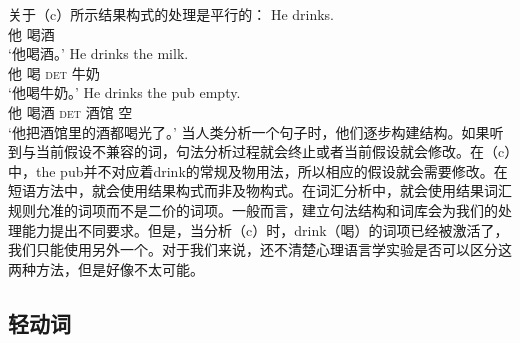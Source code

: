 \begin{exe}
\begin{xlist}[iv.]
\begin{exe}
\begin{xlist}[iv.]
关于（c）所示结果构式的处理是平行的：
\eal
\ex
\gll He drinks.\\
     他 喝酒\\
\glt `他喝酒。' 
\ex
\gll He drinks the milk.\\
     他 喝 \textsc{det} 牛奶\\
\glt `他喝牛奶。' 
\ex
\gll He drinks the pub empty.\\
     他 喝酒 \textsc{det} 酒馆 空\\
\glt `他把酒馆里的酒都喝光了。' 
\zl
当人类分析一个句子时，他们逐步构建结构。如果听到与当前假设不兼容的词，句法分析过程就会终止或者当前假设就会修改。在（c）中，the pub并不对应着drink的常规及物用法，所以相应的假设就会需要修改。在短语方法中，就会使用结果构式而非及物构式。在词汇分析中，就会使用结果词汇规则允准的词项而不是二价的词项。一般而言，建立句法结构和词库会为我们的处理能力提出不同要求。但是，当分析（c）时，drink（喝）的词项已经被激活了，我们只能使用另外一个。对于我们来说，还不清楚心理语言学实验是否可以区分这两种方法，但是好像不太可能。

\subsection{轻动词}
\label{sec-psycho-lv}


\end{xlist}
\end{exe}
\end{xlist}
\end{exe}

